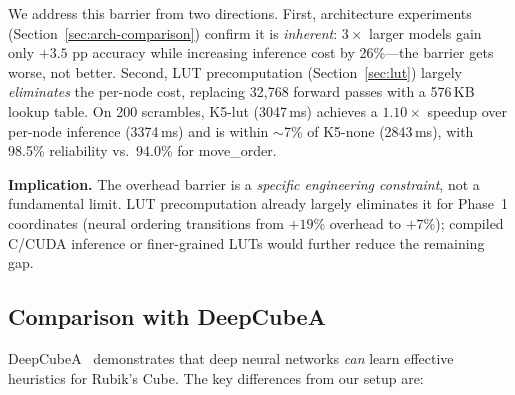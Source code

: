 \documentclass[conference]{IEEEtran}
\begin{document}
We address this barrier from two directions. First, architecture experiments (Section~\ref{sec:arch-comparison}) confirm it is \emph{inherent}: $3{\times}$ larger models gain only $+3.5$ pp accuracy while increasing inference cost by 26\%---the barrier gets worse, not better. Second, LUT precomputation (Section~\ref{sec:lut}) largely \emph{eliminates} the per-node cost, replacing 32{,}768 forward passes with a 576\,KB lookup table. On 200 scrambles, K5-lut (3047\,ms) achieves a $1.10{\times}$ speedup over per-node inference (3374\,ms) and is within ${\sim}$7\% of K5-none (2843\,ms), with 98.5\% reliability vs.\ 94.0\% for move\_order.

\textbf{Implication.} The overhead barrier is a \emph{specific engineering constraint}, not a fundamental limit. LUT precomputation already largely eliminates it for Phase~1 coordinates (neural ordering transitions from $+19$\% overhead to $+7$\%); compiled C/CUDA inference or finer-grained LUTs would further reduce the remaining gap.

\subsection{Comparison with DeepCubeA}

DeepCubeA~\cite{deepcubea} demonstrates that deep neural networks \emph{can} learn effective heuristics for Rubik's Cube. The key differences from our setup are:

\begin{table}[htbp]
\centering
\caption{Architecture comparison: our neural heuristic vs.\ DeepCubeA.}
\label{tab:vs-deepcubea}
\end{table}
\end{document}
